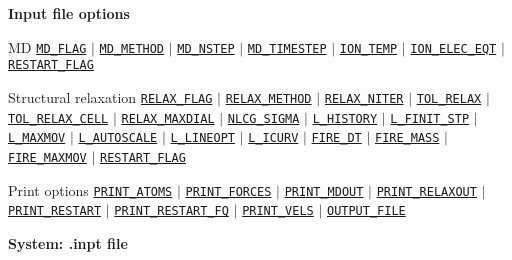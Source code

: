 \documentclass[xcolor=dvipsnames,t]{beamer}
\begin{document}
\begin{frame}[allowframebreaks]{\textbf{Input file options}}
\begin{block}{MD}
\hyperlink{MD_FLAG}{\texttt{MD\_FLAG}} $\vert$ \hyperlink{MD_METHOD}{\texttt{MD\_METHOD}} $\vert$ \hyperlink{MD_NSTEP}{\texttt{MD\_NSTEP}} $\vert$ \hyperlink{MD_TIMESTEP}{\texttt{MD\_TIMESTEP}} $\vert$ \hyperlink{ION_TEMP}{\texttt{ION\_TEMP}} $\vert$ \hyperlink{ION_ELEC_EQT}{\texttt{ION\_ELEC\_EQT}} $\vert$ \hyperlink{RESTART_FLAG}{\texttt{RESTART\_FLAG}}
\end{block}
\vspace{-2mm}
\begin{block}{Structural relaxation}
\hyperlink{RELAX_FLAG}{\texttt{RELAX\_FLAG}} $\vert$ \hyperlink{RELAX_METHOD}{\texttt{RELAX\_METHOD}} $\vert$ \hyperlink{RELAX_NITER}{\texttt{RELAX\_NITER}} $\vert$ \hyperlink{TOL_RELAX}{\texttt{TOL\_RELAX}} $\vert$ \hyperlink{TOL_RELAX_CELL}{\texttt{TOL\_RELAX\_CELL}} $\vert$ \hyperlink{RELAX_MAXDIAL}{\texttt{RELAX\_MAXDIAL}} $\vert$ \hyperlink{NLCG_SIGMA}{\texttt{NLCG\_SIGMA}} $\vert$ \hyperlink{L_HISTORY}{\texttt{L\_HISTORY}} $\vert$ \hyperlink{L_FINIT_STP}{\texttt{L\_FINIT\_STP}} $\vert$ \hyperlink{L_MAXMOV}{\texttt{L\_MAXMOV}} $\vert$ \hyperlink{L_AUTOSCALE}{\texttt{L\_AUTOSCALE}} $\vert$ \hyperlink{L_LINEOPT}{\texttt{L\_LINEOPT}} $\vert$ \hyperlink{L_ICURV}{\texttt{L\_ICURV}} $\vert$ \hyperlink{FIRE_DT}{\texttt{FIRE\_DT}} $\vert$ \hyperlink{FIRE_MASS}{\texttt{FIRE\_MASS}} $\vert$ \hyperlink{FIRE_MAXMOV}{\texttt{FIRE\_MAXMOV}} $\vert$ \hyperlink{RESTART_FLAG}{\texttt{RESTART\_FLAG}}
\end{block}

\begin{block}{Print options}
\hyperlink{PRINT_ATOMS}{\texttt{PRINT\_ATOMS}} $\vert$ \hyperlink{PRINT_FORCES}{\texttt{PRINT\_FORCES}} $\vert$ \hyperlink{PRINT_MDOUT}{\texttt{PRINT\_MDOUT}} $\vert$ \hyperlink{PRINT_RELAXOUT}{\texttt{PRINT\_RELAXOUT}} $\vert$ \hyperlink{PRINT_RESTART}{\texttt{PRINT\_RESTART}} $\vert$ \hyperlink{PRINT_RESTART_FQ}{\texttt{PRINT\_RESTART\_FQ}} $\vert$ \hyperlink{PRINT_VELS}{\texttt{PRINT\_VELS}} $\vert$ \hyperlink{OUTPUT_FILE}{\texttt{OUTPUT\_FILE}}
\end{block}


\end{frame}



\begin{frame}[allowframebreaks,c]{} \label{System}

\begin{center}
\Huge \textbf{System: .inpt file}
\end{center}

\end{frame}
\end{document}
